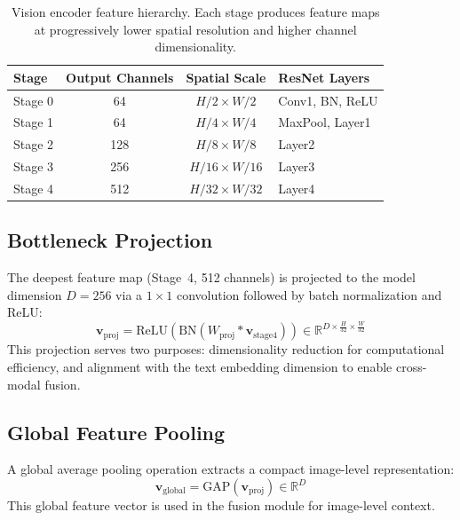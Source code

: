 \begin{table}[htbp]
	\caption{Vision encoder feature hierarchy. Each stage produces feature maps at progressively lower spatial resolution and higher channel dimensionality.}
	\label{tab:encoder_stages}
	\centering
	\begin{tabular}{lccl}
		\toprule
		\textbf{Stage} & \textbf{Output Channels} & \textbf{Spatial Scale} & \textbf{ResNet Layers} \\
		\midrule
		Stage 0 & 64  & $H/2 \times W/2$   & Conv1, BN, ReLU \\
		Stage 1 & 64  & $H/4 \times W/4$   & MaxPool, Layer1 \\
		Stage 2 & 128 & $H/8 \times W/8$   & Layer2 \\
		Stage 3 & 256 & $H/16 \times W/16$ & Layer3 \\
		Stage 4 & 512 & $H/32 \times W/32$ & Layer4 \\
		\bottomrule
	\end{tabular}
\end{table}

\subsection{Bottleneck Projection}
\label{sec:approach:bottleneck}

The deepest feature map (Stage~4, 512 channels) is projected to the model dimension $D = 256$ via a $1 \times 1$ convolution followed by batch normalization and ReLU:
\begin{equation}
	\mathbf{v}_{\text{proj}} = \text{ReLU}\left(\text{BN}\left(W_{\text{proj}} \ast \mathbf{v}_{\text{stage4}}\right)\right) \in \mathbb{R}^{D \times \frac{H}{32} \times \frac{W}{32}}
\end{equation}
This projection serves two purposes: dimensionality reduction for computational efficiency, and alignment with the text embedding dimension to enable cross-modal fusion.

\subsection{Global Feature Pooling}
\label{sec:approach:globalpool}

A global average pooling operation extracts a compact image-level representation:
\begin{equation}
	\mathbf{v}_{\text{global}} = \text{GAP}(\mathbf{v}_{\text{proj}}) \in \mathbb{R}^{D}
\end{equation}
This global feature vector is used in the fusion module for image-level context.



